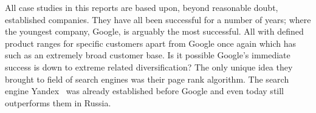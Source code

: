 
All case studies in this reports are based upon, beyond reasonable doubt, established companies.
They have all been successful for a number of years; where the youngest company, Google, is arguably the most successful.
All with defined product ranges for specific customers apart from Google once again which has such as an extremely broad customer base.
Is it possible Google's immediate success is down to extreme related diversification?
The only unique idea they brought to field of search engines was their page rank algorithm.
The search engine Yandex~\cite{Yandex} was already established before Google and even today still outperforms them in Russia. 
